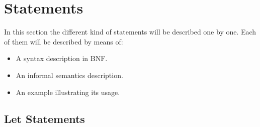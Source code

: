 \documentclass[\pformat,12pt]{article}
\begin{document}
\section{Statements}\label{sec:stmt}

In this section the different kind of statements will be described
one by one. Each of them will be described by means of:
\begin{itemize}
\item A syntax description in BNF.
\item An informal semantics description.
\item An example illustrating its usage.
\end{itemize}

\subsection{Let Statements}\label{letstmt}
\end{document}
